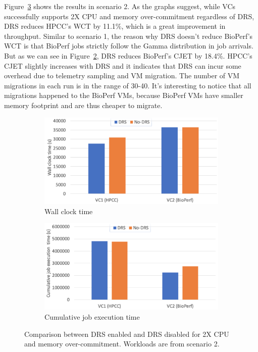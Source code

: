 Figure~\ref{fig:memory_scenario_2} shows the results in scenario 2. As the graphs suggest, while VCs successfully supports 2X CPU and memory over-commitment regardless of DRS, DRS reduces HPCC's WCT by 11.1\%, which is a great improvement in throughput. 
Similar to scenario 1, the reason why DRS doesn't reduce BioPerf's WCT is that BioPerf jobs strictly follow the Gamma distribution in job arrivals.
But as we can see in Figure~\ref{fig:memory_cjet_2}, DRS reduces BioPerf's CJET by 18.4\%.
HPCC's CJET slightly increases with DRS and it indicates that DRS can incur some overhead 
due to telemetry sampling and VM migration. 
The number of VM migrations in each run is in the range of 30-40. It's interesting to notice that all migrations happened to the BioPerf VMs, because BioPerf VMs have smaller memory footprint and are thus cheaper to migrate.

\begin{figure}
     \centering
     \begin{subfigure}[b]{0.48\textwidth}
         \centering
         \includegraphics[width=\textwidth]{Figures/memory_wct_2.pdf}
         \caption{Wall clock time}
         \label{fig:memory_wct_2}
     \end{subfigure}
     \hfill
     \begin{subfigure}[b]{0.48\textwidth}
         \centering
         \includegraphics[width=\textwidth]{Figures/memory_cjet_2.pdf}
         \caption{Cumulative job execution time}
         \label{fig:memory_cjet_2}
     \end{subfigure}
     \caption{Comparison between DRS enabled and DRS disabled for 2X CPU and memory over-commitment. Workloads are from scenario 2. }
     \label{fig:memory_scenario_2}
\end{figure}

